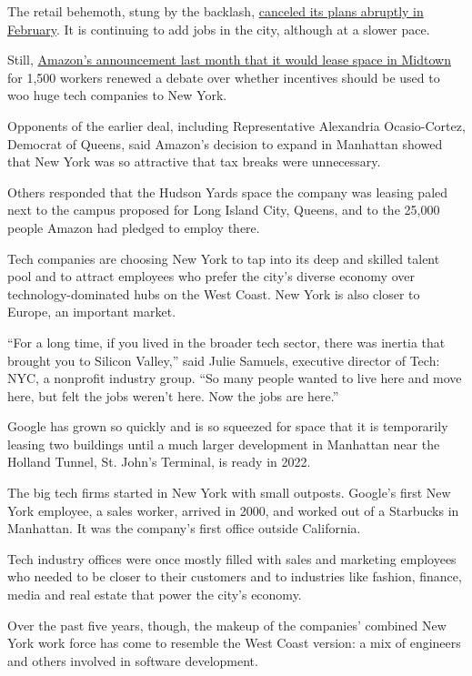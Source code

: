 The retail behemoth, stung by the backlash,
\href{https://www.nytimes3xbfgragh.onion/2019/02/14/nyregion/amazon-hq2-queens.html}{canceled
its plans abruptly in February}. It is continuing to add jobs in the
city, although at a slower pace.

Still,
\href{https://www.nytimes3xbfgragh.onion/2019/12/06/nyregion/amazon-hudson-yards.html}{Amazon's
announcement last month that it would lease space in Midtown} for 1,500
workers renewed a debate over whether incentives should be used to woo
huge tech companies to New York.

Opponents of the earlier deal, including Representative Alexandria
Ocasio-Cortez, Democrat of Queens, said Amazon's decision to expand in
Manhattan showed that New York was so attractive that tax breaks were
unnecessary.

Others responded that the Hudson Yards space the company was leasing
paled next to the campus proposed for Long Island City, Queens, and to
the 25,000 people Amazon had pledged to employ there.

Tech companies are choosing New York to tap into its deep and skilled
talent pool and to attract employees who prefer the city's diverse
economy over technology-dominated hubs on the West Coast. New York is
also closer to Europe, an important market.

``For a long time, if you lived in the broader tech sector, there was
inertia that brought you to Silicon Valley,'' said Julie Samuels,
executive director of Tech: NYC, a nonprofit industry group. ``So many
people wanted to live here and move here, but felt the jobs weren't
here. Now the jobs are here.''

Google has grown so quickly and is so squeezed for space that it is
temporarily leasing two buildings until a much larger development in
Manhattan near the Holland Tunnel, St. John's Terminal, is ready in
2022.

The big tech firms started in New York with small outposts. Google's
first New York employee, a sales worker, arrived in 2000, and worked out
of a Starbucks in Manhattan. It was the company's first office outside
California.

Tech industry offices were once mostly filled with sales and marketing
employees who needed to be closer to their customers and to industries
like fashion, finance, media and real estate that power the city's
economy.

Over the past five years, though, the makeup of the companies' combined
New York work force has come to resemble the West Coast version: a mix
of engineers and others involved in software development.


